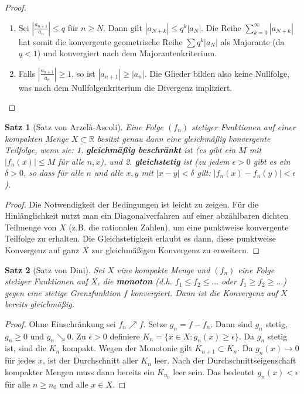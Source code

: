 \documentclass{article}
\newtheorem{satz}{Satz}[section]
\theoremstyle{definition}
\begin{document}
\begin{proof}
\begin{enumerate}[label=\arabic*.]
    \item Sei $|\frac{a_{n+1}}{a_n}| \le q$ für $n \ge N$. Dann gilt $|a_{N+k}| \le q^k |a_N|$. 
    Die Reihe $\sum_{k=0}^\infty |a_{N+k}|$ hat somit die konvergente geometrische Reihe $\sum q^k |a_N|$ als Majorante (da $q < 1$) und konvergiert nach dem Majorantenkriterium.
    \item Falls $|\frac{a_{n+1}}{a_n}| \ge 1$, so ist $|a_{n+1}| \ge |a_n|$. Die Glieder bilden also keine Nullfolge, was nach dem Nullfolgenkriterium die Divergenz impliziert.
\end{enumerate}
\end{proof}
\begin{satz}[Satz von Arzelà-Ascoli]
Eine Folge $(f_n)$ stetiger Funktionen auf einer kompakten Menge $X \subset \mathbb{R}$ besitzt genau dann eine gleichmäßig konvergente Teilfolge, wenn sie:
1. \textbf{gleichmäßig beschränkt} ist (es gibt ein $M$ mit $|f_n(x)| \le M$ für alle $n, x$), und
2. \textbf{gleichstetig} ist (zu jedem $\epsilon > 0$ gibt es ein $\delta > 0$, so dass für alle $n$ und alle $x, y$ mit $|x-y| < \delta$ gilt: $|f_n(x) - f_n(y)| < \epsilon$).


\end{satz}
\begin{proof}
Die Notwendigkeit der Bedingungen ist leicht zu zeigen. Für die Hinlänglichkeit nutzt man ein Diagonalverfahren auf einer abzählbaren dichten Teilmenge von $X$ (z.B. die rationalen Zahlen), um eine punktweise konvergente Teilfolge zu erhalten. Die Gleichstetigkeit erlaubt es dann, diese punktweise Konvergenz auf ganz $X$ zur gleichmäßigen Konvergenz zu erweitern.
\end{proof}
\begin{satz}[Satz von Dini]
Sei $X$ eine kompakte Menge und $(f_n)$ eine Folge stetiger Funktionen auf $X$, die \textbf{monoton} (d.h. $f_1 \le f_2 \le \dots$ oder $f_1 \ge f_2 \ge \dots$) gegen eine stetige Grenzfunktion $f$ konvergiert. Dann ist die Konvergenz auf $X$ bereits gleichmäßig.


\end{satz}
\begin{proof}
Ohne Einschränkung sei $f_n \nearrow f$. Setze $g_n = f - f_n$. Dann sind $g_n$ stetig, $g_n \ge 0$ und $g_n \searrow 0$. Zu $\epsilon > 0$ definiere $K_n = \{x \in X : g_n(x) \ge \epsilon\}$. Da $g_n$ stetig ist, sind die $K_n$ kompakt. Wegen der Monotonie gilt $K_{n+1} \subset K_n$. Da $g_n(x) \to 0$ für jedes $x$, ist der Durchschnitt aller $K_n$ leer. Nach der Durchschnittseigenschaft kompakter Mengen muss dann bereits ein $K_{n_0}$ leer sein. Das bedeutet $g_n(x) < \epsilon$ für alle $n \ge n_0$ und alle $x \in X$.
\end{proof}
\end{document}
